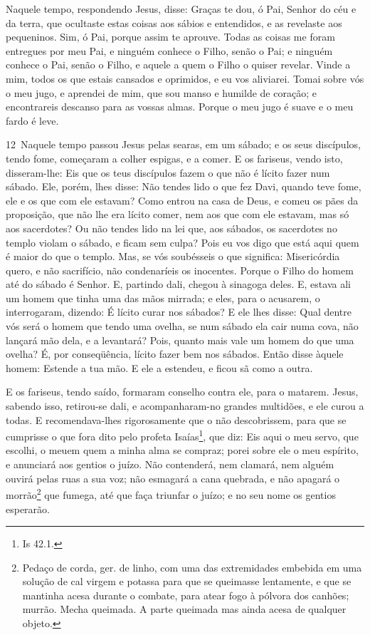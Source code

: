 Naquele tempo, respondendo Jesus, disse: Graças te dou, ó Pai,
Senhor do céu e da terra, que ocultaste estas coisas aos sábios e
entendidos, e as revelaste aos pequeninos. Sim, ó Pai, porque
assim te aprouve. Todas as coisas me foram entregues por meu
Pai, e ninguém conhece o Filho, senão o Pai; e ninguém conhece o
Pai, senão o Filho, e aquele a quem o Filho o quiser revelar.
Vinde a mim, todos os que estais cansados e oprimidos, e eu
vos aliviarei. Tomai sobre vós o meu jugo, e aprendei de mim,
que sou manso e humilde de coração; e encontrareis descanso para as
vossas almas. Porque o meu jugo é suave e o meu fardo é leve.

\medskip

\lettrine{12}\ Naquele tempo passou Jesus pelas searas, em um
sábado; e os seus discípulos, tendo fome, começaram a colher
espigas, e a comer. E os fariseus, vendo isto, disseram-lhe: Eis
que os teus discípulos fazem o que não é lícito fazer num sábado.
Ele, porém, lhes disse: Não tendes lido o que fez Davi, quando
teve fome, ele e os que com ele estavam? Como entrou na casa de
Deus, e comeu os pães da proposição, que não lhe era lícito comer,
nem aos que com ele estavam, mas só aos sacerdotes? Ou não
tendes lido na lei que, aos sábados, os sacerdotes no templo violam
o sábado, e ficam sem culpa? Pois eu vos digo que está aqui quem
é maior do que o templo. Mas, se vós soubésseis o que significa:
Misericórdia quero, e não sacrifício, não condenaríeis os inocentes.
Porque o Filho do homem até do sábado é Senhor. E, partindo
dali, chegou à sinagoga deles. E, estava ali um homem que
tinha uma das mãos mirrada; e eles, para o acusarem, o interrogaram,
dizendo: É lícito curar nos sábados? E ele lhes disse: Qual
dentre vós será o homem que tendo uma ovelha, se num sábado ela cair
numa cova, não lançará mão dela, e a levantará? Pois, quanto
mais vale um homem do que uma ovelha? É, por conseqüência, lícito
fazer bem nos sábados. Então disse àquele homem: Estende a
tua mão. E ele a estendeu, e ficou sã como a outra.

E os fariseus, tendo saído, formaram conselho contra ele, para o
matarem. Jesus, sabendo isso, retirou-se dali, e
a\-com\-pa\-nha\-ram-no grandes multidões, e ele curou a todas. E
recomendava-lhes rigorosamente que o não descobrissem, para
que se cumprisse o que fora dito pelo profeta Isaías\footnote{Is
42.1.}, que diz: Eis aqui o meu servo, que escolhi, o meuem quem a minha alma se compraz; porei sobre ele o meu
espírito, e anunciará aos gentios o juízo. Não contenderá,
nem clamará, nem alguém ouvirá pelas ruas a sua voz; não
esmagará a cana quebrada, e não apagará o morrão\footnote{Pedaço de
corda, ger. de linho, com uma das extremidades embebida em uma
solução de cal virgem e potassa para que se queimasse lentamente, e
que se mantinha acesa durante o combate, para atear fogo à pólvora
dos canhões; murrão. Mecha queimada. A parte queimada mas ainda
acesa de qualquer objeto.} que fumega, até que faça triunfar o
juízo; e no seu nome os gentios esperarão.

